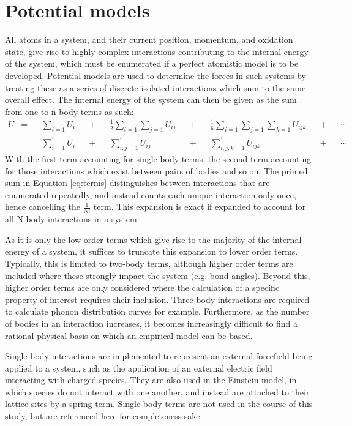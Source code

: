 \section{Potential models}
All atoms in a system, and their current position, momentum, and oxidation state, give rise to highly complex interactions contributing to the internal energy of the system, which must be enumerated if a perfect atomistic model is to be developed.
Potential models are used to determine the forces in such systems by treating these as a series of discrete isolated interactions which sum to the same overall effect. 
The internal energy of the system can then be given as the sum from one to n-body terms as such:\cite{Gale2003}
\begin{align}
U &=& &\sum_{i = 1} U_i&         &+& &\frac{1}{2}\sum_{i = 1} \sum_{j = 1} U_{ij}&  &+& &\frac{1}{6}\sum_{i = 1} \sum_{j = 1} \sum_{k = 1} U_{ijk}& &+& &\cdots\\
&=& &\sum_{i = 1}^\prime U_i&  &+& &\sum_{i,j = 1}^\prime U_{ij}&                 &+& &\sum_{i,j,k = 1}^\prime U_{ijk}&                           &+& &\cdots
\label{eq:terms}
\end{align}
With the first term accounting for single-body terms, the second term accounting for those interactions which exist between pairs of bodies and so on.
The primed sum in Equation \ref{eq:terms} distinguishes between interactions that are enumerated repeatedly, and instead counts each unique interaction only once, hence cancelling the $\frac{1}{N!}$ term.
This expansion is exact if expanded to account for all N-body interactions in a system.

As it is only the low order terms which give rise to the majority of the internal energy of a system, it suffices to truncate this expansion to lower order terms.
Typically, this is limited to two-body terms, although higher order terms are included where these strongly impact the system (e.g. bond angles).
Beyond this, higher order terms are only considered where the calculation of a specific property of interest requires their inclusion.
Three-body interactions are required to calculate phonon distribution curves for example.
Furthermore, as the number of bodies in an interaction increases, it becomes increasingly difficult to find a rational physical basis on which an empirical model can be based. 
 
Single body interactions are implemented to represent an external forcefield being applied to a system, such as the application of an external electric field interacting with charged species.
They are also used in the Einstein model, in which species do not interact with one another, and instead are attached to their lattice sites by a spring term.
Single body terms are not used in the course of this study, but are referenced here for completeness sake.
